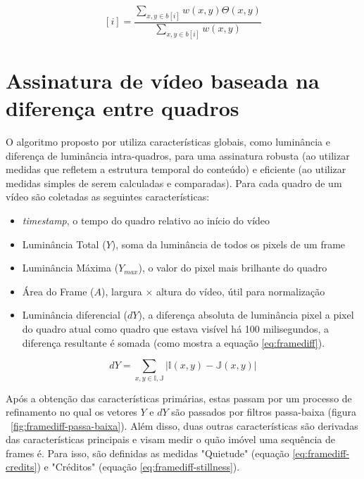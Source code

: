 \begin{equation}
	\label{eq:gradientes}
	[i] = \frac{\sum_{x,y \in b[i]} w(x,y)\Theta (x,y)}{\sum_{x,y \in b[i]} w(x,y)}
\end{equation}
    
%
%

\section{Assinatura de vídeo baseada na diferença entre quadros}
\label{sec:framediff}

  O algoritmo proposto por \cite{cook2011efficient} utiliza características globais, como luminância e diferença de luminância intra-quadros, para uma assinatura robusta (ao utilizar medidas que refletem a estrutura temporal do conteúdo) e eficiente (ao utilizar medidas simples de serem calculadas e comparadas). Para cada quadro de um vídeo são coletadas as seguintes características: 

  \begin{itemize}
    \item \textit{timestamp}, o tempo do quadro relativo ao início do vídeo
    \item Luminância Total ($Y$), soma da luminância de todos os pixels de um frame
    \item Luminância Máxima ($Y_{max}$), o valor do pixel mais brilhante do quadro
    \item Área do Frame ($A$), largura $\times$ altura do vídeo, útil para normalização
    \item Luminância diferencial ($dY$), a diferença absoluta de luminância pixel a pixel do quadro atual como quadro que estava visível há 100 milisegundos, a diferença resultante é somada (como mostra a equação \ref{eq:framediff}). 
  \end{itemize}

\begin{equation}
	\label{eq:framediff}
	dY = \sum_{x,y \in  \mathbb{I,J}} |\mathbb{I}(x,y) - \mathbb{J}(x,y)|
\end{equation} 

  Após a obtenção das características primárias, estas passam por um processo de refinamento no qual os vetores $Y$ e $dY$ são passados por filtros passa-baixa (figura ~\ref{fig:framediff-passa-baixa}). Além disso, duas outras características são derivadas das características principais e visam medir o quão imóvel uma sequência de frames é. Para isso, são definidas as medidas "Quietude" (equação \ref{eq:framediff-credits}) e "Créditos" (equação \ref{eq:framediff-stillness}).

